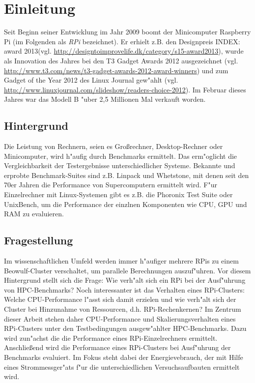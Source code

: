\chapter{Einleitung}\label{Kapitel 1}


Seit Beginn seiner Entwicklung im Jahr 2009 boomt der Minicomputer Raspberry Pi (im Folgenden als \textit{RPi} bezeichnet). Er erhielt z.B. den Designpreis INDEX: award 2013\newline(vgl. \url{http://designtoimprovelife.dk/category/s15-award2013}), wurde als Innovation des Jahres bei den T3 Gadget Awards 2012 ausgezeichnet (vgl. \url{http://www.t3.com/news/t3-gadget-awards-2012-award-winners}) und zum Gadget of the Year 2012 des Linux Journal gew"ahlt (vgl. \url{http://www.linuxjournal.com/slideshow/readers-choice-2012}). Im Februar dieses Jahres war das Modell B "uber 2,5 Millionen Mal verkauft worden. 

\section{Hintergrund}\label{Hintergrund}

Die Leistung von Rechnern, seien es Gro\ss rechner, Desktop-Rechner oder Minicomputer, wird h"aufig durch Benchmarks ermittelt. Das erm"oglicht die Vergleichbarkeit der Testergebnisse unterschiedlicher Systeme. Bekannte und erprobte Benchmark-Suites sind z.B. Linpack und Whetstone, mit denen seit den 70er Jahren die Performance von Supercomputern ermittelt wird. F"ur Einzelrechner mit Linux-Systemen gibt es z.B. die Phoronix Test Suite oder UnixBench, um die Performance der einzlnen Komponenten wie CPU, GPU und RAM zu evaluieren. 

\section{Fragestellung}\label{Fragestellung}

Im wissenschaftlichen Umfeld werden immer h"aufiger mehrere RPis zu einem Beowulf-Cluster %
verschaltet, um parallele Berechnungen auszuf"uhren. Vor diesem Hintergrund stellt sich die Frage: Wie verh"alt sich ein RPi bei der Ausf"uhrung von HPC-Benchmarks? Noch interessanter ist das Verhalten eines RPi-Clusters: Welche CPU-Performance l"asst sich damit erzielen und wie verh"alt sich der Cluster bei Hinzunahme von Ressourcen, d.h. RPi-Rechenkernen? Im Zentrum dieser Arbeit stehen daher CPU-Performance und Skalierungsverhalten eines RPi-Clusters unter den Testbedingungen ausgew"ahlter HPC-Benchmarks. Dazu wird zun"achst die die Performance eines RPi-Einzelrechners ermittelt. Anschlie\ss end wird die Performance eines RPi-Clusters bei Ausf"uhrung der Benchmarks evaluiert. Im Fokus steht dabei der Energievebrauch, der mit Hilfe eines Strommessger"ats f"ur die unterschiedlichen Versuchsaufbauten ermittelt wird. 

